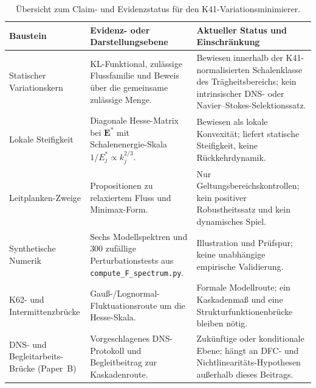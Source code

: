 \documentclass[12pt,a4paper]{article}
\theoremstyle{definition}
\theoremstyle{plain}
\theoremstyle{remark}
\begin{document}
\begin{table}[htbp]
\centering
\small
\setlength{\tabcolsep}{4.5pt}
\renewcommand{\arraystretch}{1.18}
\begin{tabular}{L{0.22\textwidth}L{0.37\textwidth}L{0.35\textwidth}}
\toprule
\textbf{Baustein} & \textbf{Evidenz- oder Darstellungsebene} & \textbf{Aktueller Status und Einschränkung} \\
\midrule
Statischer Variationskern & KL-Funktional, zulässige Flussfamilie und Beweis über die gemeinsame zulässige Menge. & Bewiesen innerhalb der K41-normalisierten Schalenklasse des Trägheitsbereichs; kein intrinsischer DNS- oder Navier--Stokes-Selektionssatz. \\
\addlinespace[3pt]
Lokale Steifigkeit & Diagonale Hesse-Matrix bei $\mathbf{E}^*$ mit Schalenenergie-Skala $1/E_j^* \propto k_j^{2/3}$. & Bewiesen als lokale Konvexität; liefert statische Steifigkeit, keine Rückkehrdynamik. \\
\addlinespace[3pt]
Leitplanken-Zweige & Propositionen zu relaxiertem Fluss und Minimax-Form. & Nur Geltungsbereichskontrollen; kein positiver Robustheitssatz und kein dynamisches Spiel. \\
\addlinespace[3pt]
Synthetische Numerik & Sechs Modellspektren und $300$ zufällige Perturbationstests aus \texttt{compute\_F\_spectrum.py}. & Illustration und Prüfspur; keine unabhängige empirische Validierung. \\
\addlinespace[3pt]
K62- und Intermittenzbrücke & Gauß-/Lognormal-Fluktuationsroute um die Hesse-Skala. & Formale Modellroute; ein Kaskadenmaß und eine Strukturfunktionenbrücke bleiben nötig. \\
\addlinespace[3pt]
DNS- und Begleitarbeits-Brücke (Paper~B) & Vorgeschlagenes DNS-Protokoll und Begleitbeitrag zur Kaskadenroute. & Zukünftige oder konditionale Ebene; hängt an DFC- und Nichtlinearitäts-Hypothesen außerhalb dieses Beitrags. \\
\bottomrule
\end{tabular}
\caption{Übersicht zum Claim- und Evidenzstatus für den K41-Variationsminimierer.}
\label{tab:claim-status-ledger}
\end{table}
\end{document}
